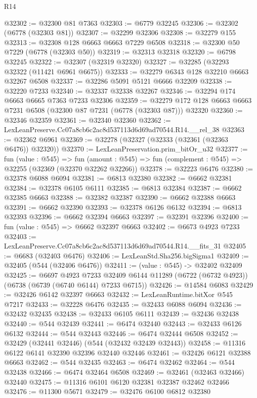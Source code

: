 \begin{lexlean}{R14}
\begin{coremodule}
@32302 := @32300 @81 @7363
@32303 := @6779 @32245
@32306 := @32302 (@6778 (@32303 @81))
@32307 := @32299 @32306
@32308 := @32279 @155
@32313 := @32308 @128 @6663 @6663 @7229 @6508
@32318 := @32300 @50 @7229 (@6778 (@32303 @50))
@32319 := @32313 @32318
@32320 := @6798 @32245
@32322 := @32307 (@32319 @32320)
@32327 := @32285 (@32293 @32322 (@11421 @6961 @6675))
@32333 := @32279 @6343 @128 @32210 @6663 @32267 @6508
@32337 := @32286 @5091 @5121 @6666 @32209
@32338 := @32220 @7233
@32340 := @32337 @32338 @32267
@32346 := @32294 @174 @6663 @6665 @7363 @7233 @32306
@32359 := @32279 @172 @128 @6663 @6663 @7231 @6508 (@32300 @87 @7231 (@6778 (@32303 @87))) @32320
@32360 := @32346 @32359
@32361 := @32340 @32360
@32362 := LexLeanPreserve.Cc07a8cb6c2ac8d537113d6d69ad70544.R14.__rel_38
@32363 := @32362 @6961
@32369 := @32278 (@32327 (@32333 (@32361 (@32363 @6476)) @32320))
@32370 := LexLeanPreservation.prim_bitOr_u32
@32377 := fun (value : @545) =>
  fun (amount : @545) => fun (complement : @545) => @32255 (@32369 (@32370 @32262 @32266))
@32378 := @32223 @6476
@32380 := @32378 @6088 @6094
@32381 := @6813 @32380
@32382 := @6662 @32381
@32384 := @32378 @6105 @6111
@32385 := @6813 @32384
@32387 := @6662 @32385 @6663
@32388 := @32382 @32387
@32390 := @6662 @32388 @6663
@32391 := @6662 @32390
@32393 := @32378 @6126 @6132
@32394 := @6813 @32393
@32396 := @6662 @32394 @6663
@32397 := @32391 @32396
@32400 := fun (value : @545) => @6662 @32397 @6663
@32402 := @6673 @4923 @7233
@32403 := LexLeanPreserve.Cc07a8cb6c2ac8d537113d6d69ad70544.R14.__fits_31
@32405 := @6683 (@32403 @6476)
@32406 := LexLeanStd.Sha256.bigSigma1
@32409 := @32405 (@544 (@32406 @6476))
@32411 := (value : @545) -> @32402 @32409
@32425 := @6697
    @4923
    @7233
    @32409
    @6144
    @11289
    (@6722 (@6732 @4923))
    (@6738 (@6739 (@6740 @6144) @7233 @6715))
@32426 := @14584 @6083
@32429 := @32426 @6142 @32397 @6663
@32432 := LexLeanRuntime.bitXor @545 @7217
@32433 := @32228 @6476
@32435 := @32433 @6088 @6094
@32436 := @32432 @32435
@32438 := @32433 @6105 @6111
@32439 := @32436 @32438
@32440 := @544 @32439
@32441 := @6474 @32440
@32443 := @32433 @6126 @6132
@32444 := @544 @32443
@32446 := @6474 @32444 @6508
@32452 := @32429 (@32441 @32446) (@544 (@32432 @32439 @32443))
@32458 := @11316 @6122 @6141 @32390 @32396 @32440 @32446
@32461 := @32426 @6121 @32388 @6663
@32462 := @544 @32435
@32463 := @6474 @32462
@32464 := @544 @32438
@32466 := @6474 @32464 @6508
@32469 := @32461 (@32463 @32466) @32440
@32475 := @11316 @6101 @6120 @32381 @32387 @32462 @32466
@32476 := @11300 @5671
@32479 := @32476 @6100 @6812 @32380

\end{coremodule}
\end{lexlean}
